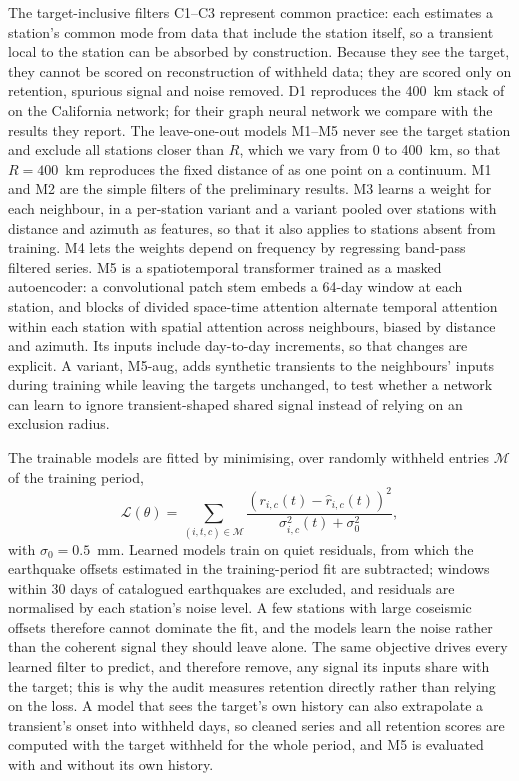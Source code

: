 \documentclass[11pt,a4paper]{article}
\begin{document}
The target-inclusive filters C1--C3 represent common practice: each estimates a station's common mode from data that include the station itself, so a transient local to the station can be absorbed by construction. Because they see the target, they cannot be scored on reconstruction of withheld data; they are scored only on retention, spurious signal and noise removed. D1 reproduces the 400~km stack of \citet{bachelot2025} on the California network; for their graph neural network we compare with the results they report. The leave-one-out models M1--M5 never see the target station and exclude all stations closer than $R$, which we vary from 0 to 400~km, so that $R = 400$~km reproduces the fixed distance of \citet{bachelot2025} as one point on a continuum. M1 and M2 are the simple filters of the preliminary results. M3 learns a weight for each neighbour, in a per-station variant and a variant pooled over stations with distance and azimuth as features, so that it also applies to stations absent from training. M4 lets the weights depend on frequency by regressing band-pass filtered series. M5 is a spatiotemporal transformer trained as a masked autoencoder: a convolutional patch stem embeds a 64-day window at each station, and blocks of divided space-time attention alternate temporal attention within each station with spatial attention across neighbours, biased by distance and azimuth. Its inputs include day-to-day increments, so that changes are explicit. A variant, M5-aug, adds synthetic transients to the neighbours' inputs during training while leaving the targets unchanged, to test whether a network can learn to ignore transient-shaped shared signal instead of relying on an exclusion radius.

The trainable models are fitted by minimising, over randomly withheld entries $\mathcal{M}$ of the training period,
\begin{equation}
\mathcal{L}(\theta) = \sum_{(i,t,c) \in \mathcal{M}} \frac{\left(r_{i,c}(t) - \hat{r}_{i,c}(t)\right)^2}{\sigma_{i,c}^2(t) + \sigma_0^2},
\end{equation}
with $\sigma_0 = 0.5$~mm. Learned models train on quiet residuals, from which the earthquake offsets estimated in the training-period fit are subtracted; windows within 30 days of catalogued earthquakes are excluded, and residuals are normalised by each station's noise level. A few stations with large coseismic offsets therefore cannot dominate the fit, and the models learn the noise rather than the coherent signal they should leave alone. The same objective drives every learned filter to predict, and therefore remove, any signal its inputs share with the target; this is why the audit measures retention directly rather than relying on the loss. A model that sees the target's own history can also extrapolate a transient's onset into withheld days, so cleaned series and all retention scores are computed with the target withheld for the whole period, and M5 is evaluated with and without its own history.
\end{document}
